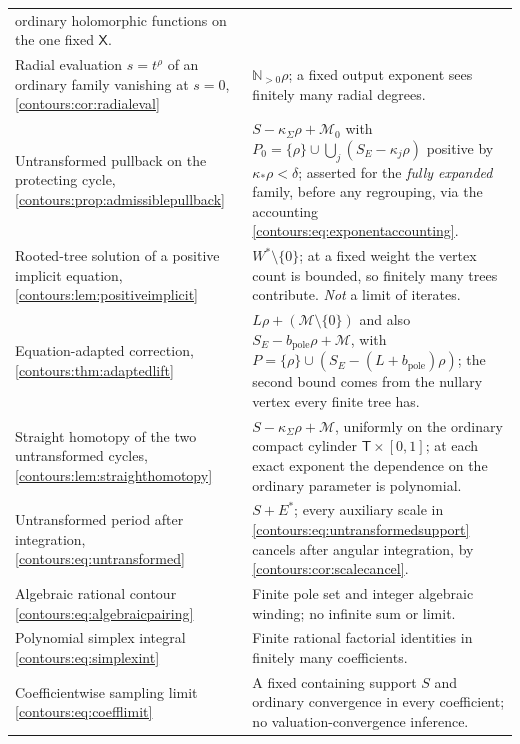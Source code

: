 \documentclass[11pt,letterpaper]{article}
\theoremstyle{definition}
\theoremstyle{remark}
\newcommand{\N}{\mathbb N}\newcommand{\Z}{\mathbb Z}\newcommand{\DD}{\mathbb D}
\numberwithin{equation}{section}
\begin{document}
\begin{center}
\begin{longtable}{@{}L{0.46\textwidth}L{0.46\textwidth}@{}}
    ordinary holomorphic functions on the one fixed $\mathsf X$.\\[0.45em]
Radial evaluation $s=t^\rho$ of an ordinary family vanishing at $s=0$,
  \cref{contours:cor:radialeval}
  & $\N_{>0}\rho$; a fixed output exponent sees finitely many radial
    degrees.\\[0.45em]
Untransformed pullback on the protecting cycle,
  \cref{contours:prop:admissiblepullback}
  & $S-\kappa_\Sigma\rho+\mathcal M_0$ with
    $P_0=\{\rho\}\cup\bigcup_j(S_E-\kappa_j\rho)$ positive by
    $\kappa_*\rho<\delta$; asserted for the \emph{fully expanded} family, before
    any regrouping, via the accounting
    \eqref{contours:eq:exponentaccounting}.\\[0.45em]
Rooted-tree solution of a positive implicit equation,
  \cref{contours:lem:positiveimplicit}
  & $W^*\setminus\{0\}$; at a fixed weight the vertex count is bounded, so
    finitely many trees contribute. \emph{Not} a limit of iterates.\\[0.45em]
Equation-adapted correction, \cref{contours:thm:adaptedlift}
  & $L\rho+(\mathcal M\setminus\{0\})$ and also
    $S_E-b_{\mathrm{pole}}\rho+\mathcal M$, with
    $P=\{\rho\}\cup(S_E-(L+b_{\mathrm{pole}})\rho)$; the second bound comes from
    the nullary vertex every finite tree has.\\[0.45em]
Straight homotopy of the two untransformed cycles,
  \cref{contours:lem:straighthomotopy}
  & $S-\kappa_\Sigma\rho+\mathcal M$, uniformly on the ordinary compact cylinder
    $\mathsf T\times[0,1]$; at each exact exponent the dependence on the ordinary
    parameter is polynomial.\\[0.45em]
Untransformed period after integration,
  \eqref{contours:eq:untransformed}
  & $S+E^*$; every auxiliary scale in
    \eqref{contours:eq:untransformedsupport} cancels after angular integration,
    by \cref{contours:cor:scalecancel}.\\[0.45em]
Algebraic rational contour \eqref{contours:eq:algebraicpairing}
  & Finite pole set and integer algebraic winding; no infinite sum or limit.\\[0.45em]
Polynomial simplex integral \eqref{contours:eq:simplexint}
  & Finite rational factorial identities in finitely many coefficients.\\[0.45em]
Coefficientwise sampling limit \eqref{contours:eq:coefflimit}
  & A fixed containing support $S$ and ordinary convergence in every coefficient; no
    valuation-convergence inference.\\
\bottomrule
\end{longtable}
\end{center}
\end{document}
